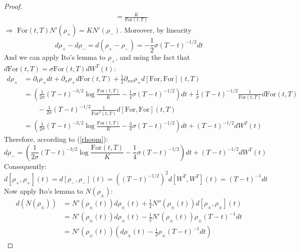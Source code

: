 \documentclass[a4paper, 10pt]{article}
\theoremstyle{definition}
\theoremstyle{hSol}
\begin{document}
\begin{proof}
\begin{equation}
\begin{split}
    &=\frac{K}{\text{For}(t,T)}
  \end{split}
\end{equation}
$\Rightarrow$ $\text{For}(t,T)N'(\rho_+) = KN'(\rho_-)$. Moreover, by linearity
\begin{equation}\label{rhopm}
  d\rho_+ - d\rho_- = d(\rho_+-\rho_-) = -\frac{1}{2}\sigma (T-t)^{-1/2}dt
\end{equation}
And we can apply Ito's lemma to $\rho_+$, and using the fact that $d\text{For}(t,T)=\sigma \text{For}(t,T)dW^T(t)$:
\begin{equation}
  \begin{split}
    d\rho_+ &= \partial_t \rho_+ dt + \partial_x \rho_+ d\text{For}(t,T) + \frac{1}{2}\partial_{xx} \rho_+ d[\text{For}, \text{For}](t,T) \\
    &= \left(\frac{1}{2\sigma}(T-t)^{-3/2}\log\frac{\text{For}(t,T)}{K} - \frac{1}{4}\sigma(T-t)^{-1/2}\right)dt + \frac{1}{\sigma}(T-t)^{-1/2}\frac{1}{\text{For}(t,T)}d\text{For}(t,T)\\
    &\qquad - \frac{1}{2\sigma}(T-t)^{-1/2}\frac{1}{\text{For}^2(t,T)}d[\text{For},\text{For}](t,T)\\
    &=\left(\frac{1}{2\sigma}(T-t)^{-3/2}\log\frac{\text{For}(t,T)}{K} - \frac{3}{4}\sigma(T-t)^{-1/2}\right)dt + (T-t)^{-1/2}dW^T(t)
  \end{split}
\end{equation}
Therefore, according to (\ref{rhopm}):
\begin{equation}
  d\rho_- = \left(\frac{1}{2\sigma}(T-t)^{-3/2}\log\frac{\text{For}(t,T)}{K} - \frac{1}{4}\sigma(T-t)^{-1/2}\right)dt + (T-t)^{-1/2}dW^T(t)
\end{equation}
Consequently:
\begin{equation}
  d[\rho_+, \rho_+](t) = d[\rho_-, \rho_-](t) = \left((T-t)^{-1/2}\right)^2d[W^T,W^T](t) =(T-t)^{-1}dt
\end{equation}
Now apply Ito's lemma to $N(\rho_{\pm})$:
\begin{equation}
  \begin{split}
    d(N(\rho_{\pm})) &= N'(\rho_{\pm}(t)) d\rho_{\pm}(t) + \frac{1}{2}N''(\rho_{\pm}(t)) d[\rho_{\pm}, \rho_{\pm}](t) \\
    &=N'(\rho_{\pm}(t)) d\rho_{\pm}(t) - \frac{1}{2}N'(\rho_{\pm}(t))\rho_{\pm} (T-t)^{-1}dt\\
    &=N'(\rho_{\pm}(t)) \left(d\rho_{\pm}(t) - \frac{1}{2}\rho_{\pm} (T-t)^{-1}dt\right)
  \end{split}
\end{equation}

\end{proof}
\end{document}

